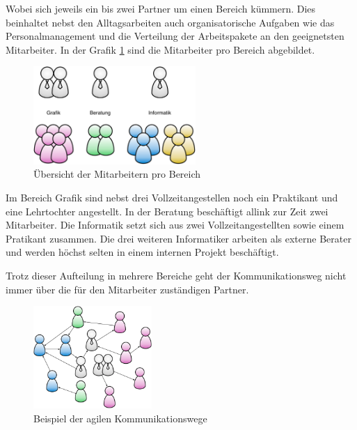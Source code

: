 Wobei sich jeweils ein bis zwei Partner um einen
Bereich kümmern. Dies beinhaltet nebst den Alltagsarbeiten auch organisatorische 
Aufgaben wie das Personalmanagement und die Verteilung der Arbeitspakete an den 
geeignetsten Mitarbeiter. In der Grafik \ref{pic:mitarbeiter_pro_bereich} 
sind die Mitarbeiter pro Bereich abgebildet.

\begin{figure}[htbp]
\begin{center}
\includegraphics[width=0.55\textwidth,angle=0]{./bilder/analyse/mitarbeiter_pro_bereich.pdf}
\caption[Übersicht der Mitarbeitern pro Bereich]{Übersicht der Mitarbeitern pro Bereich\footnotemark}
\label{pic:mitarbeiter_pro_bereich}
\end{center}
\end{figure}

Im Bereich Grafik sind nebst drei Vollzeitangestellen noch ein Praktikant und eine
Lehrtochter angestellt. In der Beratung beschäftigt allink zur Zeit zwei Mitarbeiter.
Die Informatik setzt sich aus zwei Vollzeitangestellten sowie einem Pratikant
zusammen. Die drei weiteren Informatiker arbeiten als externe Berater und
werden höchst selten in einem internen Projekt beschäftigt.

Trotz dieser Aufteilung in mehrere Bereiche geht der Kommunikationsweg nicht
immer über die für den Mitarbeiter zuständigen Partner. 

\begin{figure}[htbp]
\begin{center}
\includegraphics[width=0.40\textwidth,angle=0]{./bilder/analyse/kommunikationswege.pdf}
\caption[Beispiel der agilen Kommunikationswege]{Beispiel der agilen Kommunikationswege\footnotemark}
\label{pic:kommunikationswege}
\end{center}
\end{figure}

